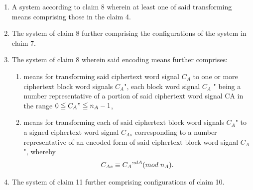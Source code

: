\documentclass[12pt, a4paper]{article}
\begin{document}
\begin{enumerate}
\item 
A system according to claim 8 wherein at least one of said transforming means comprising those in the claim 4.

\item 
The system of claim 8 further comprising the configurations of the system in claim 7.

\item 
The system of claim 8 wherein said encoding means further comprises:
	\begin{enumerate}
		\item
		means for transforming said ciphertext word signal $C_A$ to one or more ciphertext block word signals $C_A$", each block word signal $C_A$ " being a number representative of a portion of said ciphertext word signal CA in the range $0 \leqq C_{A}" \leqq n_A - 1$,
		\item
		means for transforming each of said ciphertext block word signals $C_A$" to a signed ciphertext word signal $C_{As}$ corresponding to a number representative of an encoded form of said ciphertext block word signal $C_A$ ", whereby
			\begin{gather*}
				C_{As}  \equiv {C_{A}"}^{dA} (mod \; n_A).
			\end{gather*}
	\end{enumerate}
\item The system of claim 11 further comprising configurations of claim 10.


\end{enumerate}
\end{document}
